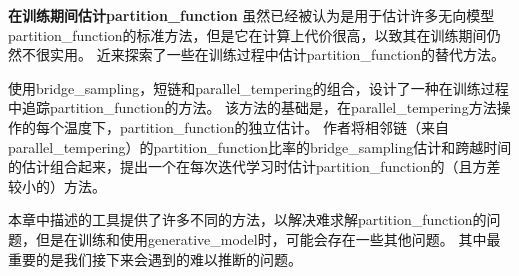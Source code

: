 \textbf{在训练期间估计\gls{partition_function}}
虽然已经被认为是用于估计许多无向模型\gls{partition_function}的标准方法，但是它在计算上代价很高，以致其在训练期间仍然不很实用。
近来探索了一些在训练过程中估计\gls{partition_function}的替代方法。


使用\gls{bridge_sampling}，短链和\gls{parallel_tempering}的组合，\cite{Desjardins+al-NIPS2011}设计了一种在训练过程中追踪\gls{partition_function}的方法。
该方法的基础是，在\gls{parallel_tempering}方法操作的每个温度下，\gls{partition_function}的独立估计。
作者将相邻链（来自\gls{parallel_tempering}）的\gls{partition_function}比率的\gls{bridge_sampling}估计和跨越时间的估计组合起来，提出一个在每次迭代学习时估计\gls{partition_function}的（且方差较小的）方法。


本章中描述的工具提供了许多不同的方法，以解决难求解\gls{partition_function}的问题，但是在训练和使用\gls{generative_model}时，可能会存在一些其他问题。
其中最重要的是我们接下来会遇到的难以推断的问题。

